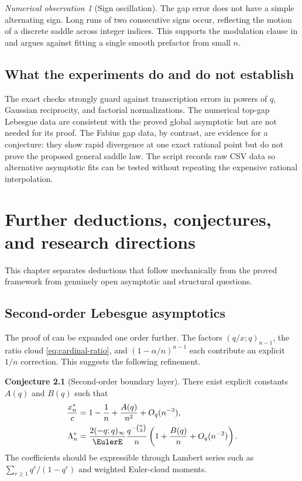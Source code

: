 \documentclass[11pt,oneside]{book}
\numberwithin{equation}{chapter}
\theoremstyle{definition}
\newtheorem{conjecture}[theorem]{Conjecture}
\theoremstyle{remark}
\newtheorem{observation}[theorem]{Numerical observation}
\newcommand{\Leb}{\Lambda}
\begin{document}
\begin{observation}[Sign oscillation]
The gap error does not have a simple alternating sign.  Long runs of two
consecutive signs occur, reflecting the motion of a discrete saddle across
integer indices.  This supports the modulation clause in
 and argues against fitting a single smooth
prefactor from small $n$.
\end{observation}

\section{What the experiments do and do not establish}

The exact checks strongly guard against transcription errors in powers of
$q$, Gaussian reciprocity, and factorial normalizations.  The numerical
top-gap Lebesgue data are consistent with the proved global asymptotic but
are not needed for its proof.
The Fabius gap data, by contrast, are evidence for a conjecture: they show
rapid divergence at one exact rational point but do not prove the proposed
general saddle law.  The script records raw CSV data so alternative
asymptotic fits can be tested without repeating the expensive rational
interpolation.

\chapter{Further deductions, conjectures, and research directions}
\label{chap:frontiers}

This chapter separates deductions that follow mechanically from the proved
framework from genuinely open asymptotic and structural questions.

\section{Second-order Lebesgue asymptotics}

The proof of  can be expanded one order further.
The factors $(q/x;q)_{n-1}$, the ratio cloud
\eqref{eq:cardinal-ratio}, and $(1-\alpha/n)^{n-1}$ each contribute an
explicit $1/n$ correction.  This suggests the following refinement.

\begin{conjecture}[Second-order boundary layer]
\label{conj:second-order-lebesgue}
There exist explicit constants $A(q)$ and $B(q)$ such that
\begin{align}
 \frac{x_n^*}{c}
 &=1-\frac1n+\frac{A(q)}{n^2}+O_q(n^{-3}),
 \label{eq:second-order-peak-conj}\\
 \Leb_n^*
 &=\frac{2(-q;q)_\infty}{\EulerE}
   \frac{q^{-\binom n2}}{n}
   \left(1+\frac{B(q)}n+O_q(n^{-2})\right).
 \label{eq:second-order-lambda-conj}
\end{align}
The coefficients should be expressible through Lambert series such as
$\sum_{r\ge1}q^r/(1-q^r)$ and weighted Euler-cloud moments.
\end{conjecture}
\end{document}
